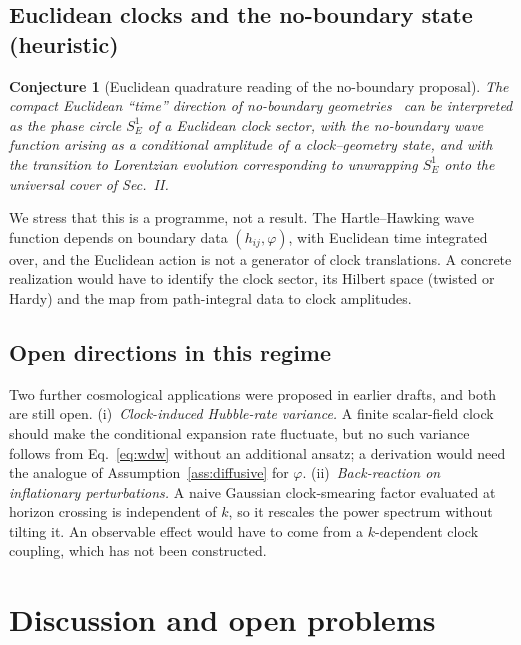 \documentclass[aps,prd,onecolumn,notitlepage,10pt,amsmath,amssymb,amsfonts,nofootinbib]{revtex4-2}
\newtheorem{conjecture}{Conjecture}
\theoremstyle{definition}
\theoremstyle{remark}
\begin{document}
\subsection{Euclidean clocks and the no-boundary state (heuristic)}
\begin{conjecture}[Euclidean quadrature reading of the no-boundary proposal]
\label{conj:hh}
The compact Euclidean ``time'' direction of no-boundary geometries~\cite{HartleHawking1983} can be interpreted as the phase circle $S^1_E$ of a Euclidean clock sector, with the no-boundary wave function arising as a conditional amplitude of a clock--geometry state, and with the transition to Lorentzian evolution corresponding to unwrapping $S^1_E$ onto the universal cover of Sec.~II.
\end{conjecture}
We stress that this is a programme, not a result. The Hartle--Hawking wave function depends on boundary data $(h_{ij},\varphi)$, with Euclidean time integrated over, and the Euclidean action is not a generator of clock translations. A concrete realization would have to identify the clock sector, its Hilbert space (twisted or Hardy) and the map from path-integral data to clock amplitudes.

\subsection{Open directions in this regime}
Two further cosmological applications were proposed in earlier drafts, and both are still open. (i)~\emph{Clock-induced Hubble-rate variance.} A finite scalar-field clock should make the conditional expansion rate fluctuate, but no such variance follows from Eq.~\eqref{eq:wdw} without an additional ansatz; a derivation would need the analogue of Assumption~\ref{ass:diffusive} for $\varphi$. (ii)~\emph{Back-reaction on inflationary perturbations.} A naive Gaussian clock-smearing factor evaluated at horizon crossing is independent of $k$, so it rescales the power spectrum without tilting it. An observable effect would have to come from a $k$-dependent clock coupling, which has not been constructed.

\section{Discussion and open problems}
\label{sec:discussion}
\end{document}
